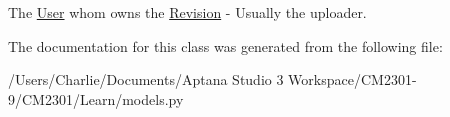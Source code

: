 The \hyperlink{class_learn_1_1models_1_1_user}{User} whom owns the \hyperlink{class_learn_1_1models_1_1_revision}{Revision} -\/ Usually the uploader. 



The documentation for this class was generated from the following file\-:\begin{DoxyCompactItemize}
\item 
/\-Users/\-Charlie/\-Documents/\-Aptana Studio 3 Workspace/\-C\-M2301-\/9/\-C\-M2301/\-Learn/models.\-py\end{DoxyCompactItemize}

